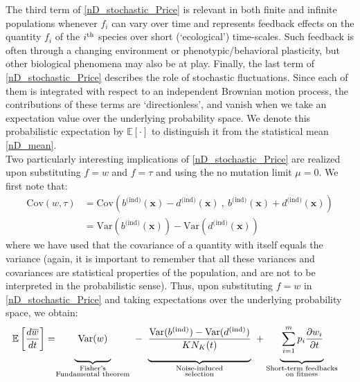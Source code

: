 The third term of \eqref{nD_stochastic_Price} is relevant in both finite and infinite populations whenever $f_i$ can vary over time and represents feedback effects on the quantity $f_i$ of the $i\textsuperscript{th}$ species over short (`ecological') time-scales. Such feedback is often through a changing environment or phenotypic/behavioral plasticity, but other biological phenomena may also be at play. Finally, the last term of \eqref{nD_stochastic_Price} describes the role of stochastic fluctuations. Since each of them is integrated with respect to an independent Brownian motion process, the contributions of these terms are `directionless', and vanish when we take an expectation value over the underlying probability space. We denote this probabilistic expectation by $\mathbb{E}[\cdot]$ to distinguish it from the statistical mean \eqref{nD_mean}.
\\
Two particularly interesting implications of \eqref{nD_stochastic_Price} are realized upon substituting $f=w$ and $f = \tau$ and using the no mutation limit $\mu = 0$. We first note that:
\begin{align}
\textrm{Cov}(w,\tau) &=\textrm{Cov}\left( b^{\textrm{(ind)}}(\mathbf{x}) - d^{\textrm{(ind)}}(\mathbf{x}) \ , \   b^{\textrm{(ind)}}(\mathbf{x}) + d^{\textrm{(ind)}}(\mathbf{x})\right)\\
&= \textrm{Var}(b^{\textrm{(ind)}}(\mathbf{x})) - \textrm{Var}(d^{\textrm{(ind)}}(\mathbf{x}))\label{nD_cross_covariance}
\end{align}
where we have used that the covariance of a quantity with itself equals the variance (again, it is important to remember that all these variances and covariances are statistical properties of the population, and are not to be interpreted in the probabilistic sense). Thus, upon substituting $f = w$ in \eqref{nD_stochastic_Price} and taking expectations over the underlying probability space, we obtain:
\begin{align}
\label{nD_stochastic_Fisher}
\mathbb{E}\left[\frac{d\overline{w}}{dt}\right] &= 
\negmedspace {\underbrace{\mystrut{4ex} \ \vphantom{ \frac{\textrm{Var}(b^{\textrm{(ind)}}) - \textrm{Var}(d^{\textrm{(ind)}})}{KN_K(t)} } \textrm{Var}(w) \ }_{\substack{\text{Fisher's} \\ \text{Fundamental theorem}}}} \ - \ {\underbrace{\mystrut{4ex}\frac{\textrm{Var}(b^{\textrm{(ind)}}) - \textrm{Var}(d^{\textrm{(ind)}})}{KN_K(t)}}_{\substack{\text{Noise-induced} \\ \text{selection}}}} \ + {\underbrace{\mystrut{4ex} \vphantom{ \frac{\textrm{Var}(b^{\textrm{(ind)}}) - \textrm{Var}(d^{\textrm{(ind)}})}{KN_K(t)} } \sum\limits_{i=1}^{m}p_i\frac{\partial w_i}{\partial t}}_{\substack{\text{Short-term feedbacks} \\ \text{on fitness}}}}
\end{align}

